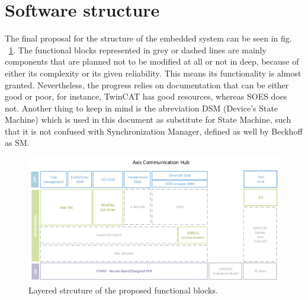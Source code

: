 \section{Software structure}
The final proposal for the structure of the embedded system can be seen in fig. ~\ref{fig:sysStruct}. 
The functional blocks represented in grey or dashed lines are mainly components that are planned not to be modified
at all or not in deep, because of either its complexity or its given reliability. This means its functionality is almost granted. 
Nevertheless, the progress relies on documentation that can be either good or poor, for instance, TwinCAT has good resources, 
whereas SOES does not. 
Another thing to keep in mind is the abreviation DSM (Device's State Machine) which is used in this document as substitute for State Machine,
such that it is not confused with Synchronization Manager, defined as well by Beckhoff as SM.
\begin{figure}[ht]
    \centering
    \includegraphics[width=\textwidth]{imgs/prop-system_struct_v2.png}
    \caption{Layered strcuture of the proposed functional blocks.}
    \label{fig:sysStruct}
\end{figure}



